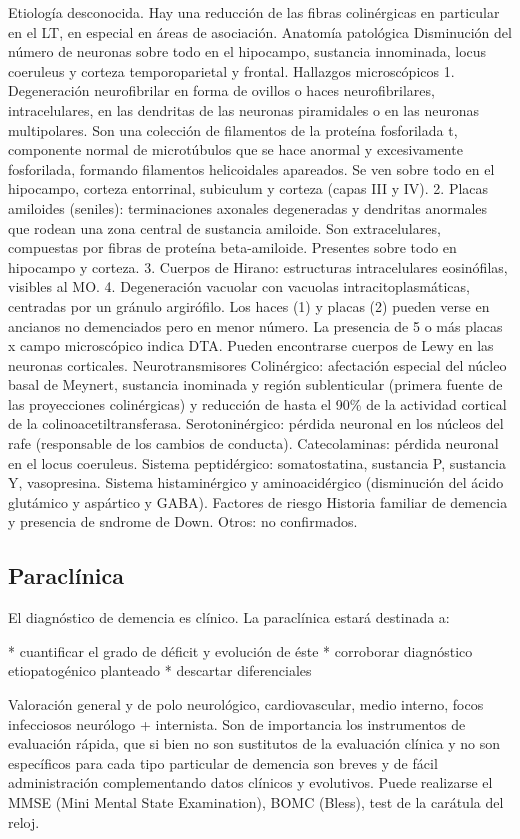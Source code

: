 \documentclass{scrbook}
\begin{document}
Etiología desconocida. Hay una reducción de las fibras colinérgicas en particular en el LT, en especial en áreas de asociación. Anatomía patológica Disminución del número de neuronas sobre todo en el hipocampo, sustancia innominada, locus coeruleus y corteza temporoparietal y frontal. Hallazgos microscópicos 1. Degeneración neurofibrilar en forma de ovillos o haces neurofibrilares, intracelulares, en las dendritas de las neuronas piramidales o en las neuronas multipolares. Son una colección de filamentos de la proteína fosforilada t, componente normal de microtúbulos que se hace anormal y excesivamente fosforilada, formando filamentos helicoidales apareados. Se ven sobre todo en el hipocampo, corteza entorrinal, subiculum y corteza (capas III y IV). 2. Placas amiloides (seniles): terminaciones axonales degeneradas y dendritas anormales que rodean una zona central de sustancia amiloide. Son extracelulares, compuestas por fibras de proteína beta-amiloide. Presentes sobre todo en hipocampo y corteza. 3. Cuerpos de Hirano: estructuras intracelulares eosinófilas, visibles al MO. 4. Degeneración vacuolar con vacuolas intracitoplasmáticas, centradas por un gránulo argirófilo. Los haces (1) y placas (2) pueden verse en ancianos no demenciados pero en menor número. La presencia de 5 o más placas x campo microscópico indica DTA. Pueden encontrarse cuerpos de Lewy en las neuronas corticales. Neurotransmisores Colinérgico: afectación especial del núcleo basal de Meynert, sustancia inominada y región sublenticular (primera fuente de las proyecciones colinérgicas) y reducción de hasta el 90\% de la actividad cortical de la colinoacetiltransferasa. Serotoninérgico: pérdida neuronal en los núcleos del rafe (responsable de los cambios de conducta). Catecolaminas: pérdida neuronal en el locus coeruleus. Sistema peptidérgico: somatostatina, sustancia P, sustancia Y, vasopresina. Sistema histaminérgico y aminoacidérgico (disminución del ácido glutámico y aspártico y GABA). Factores de riesgo Historia familiar de demencia y presencia de sndrome de Down. Otros: no confirmados.
\subsection*{Paraclínica}
El diagnóstico de demencia es clínico. La paraclínica estará destinada a:

* cuantificar el grado de déficit y evolución de éste
* corroborar diagnóstico etiopatogénico planteado
* descartar diferenciales

Valoración general y de polo neurológico, cardiovascular, medio interno, focos infecciosos neurólogo + internista. Son de importancia los instrumentos de evaluación rápida, que si bien no son sustitutos de la evaluación clínica y no son específicos para cada tipo particular de demencia son breves y de fácil administración complementando datos clínicos y evolutivos. Puede realizarse el MMSE (Mini Mental State Examination), BOMC (Bless), test de la carátula del reloj.
\end{document}
